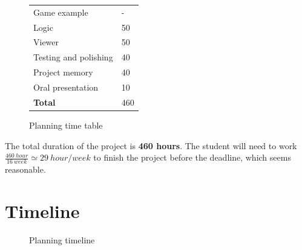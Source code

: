 \documentclass[a4paper,11pt,titlepage,abstract,numbers=noenddot,automark,mnsy,intlimits,rgb,dvipsnames]{report}
\begin{document}
\begin{figure}[H]
\begin{center}
\begin{tabular}{l | l}
\hline
Game example & -\\
\hspace{1em}
Logic & 50\\
\hspace{1em}
Viewer & 50\\
\hline
Testing and polishing & 40\\
\hline
Project memory & 40\\
\hline
Oral presentation & 10\\
\hline
\hline
\textbf{Total} & 460\\
\end{tabular}
\end{center}
\caption{Planning time table}
\label{planning_time_table}
\end{figure}
The total duration of the project is \textbf{460 hours}. The student will need to work
$\frac{460 \: hour}{16 \: week} \simeq 29 \: hour/week$ to finish the project before the deadline,
which seems reasonable.
\section{Timeline}
\begin{figure}[H]
\noindent{}
\caption{Planning timeline}
\label{planning_timeline}
\end{figure}
\end{document}
